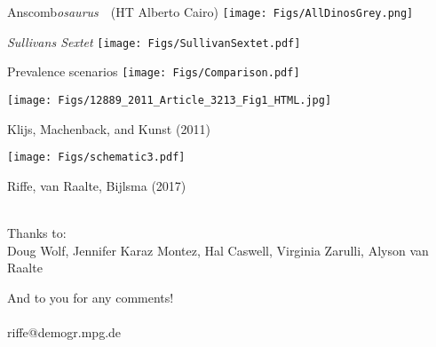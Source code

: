 \documentclass[20pt,usenames,dvipsnames]{beamer}
\begin{document}
\begin{frame}[plain]
\Huge
\begin{center}
Anscomb\emph{osaurus}~~\small (HT Alberto Cairo)
\texttt{[image: Figs/AllDinosGrey.png]}
\end{center}
\end{frame}


\begin{frame}[plain]
\Huge
\begin{center}
\emph{Sullivans Sextet} 
\texttt{[image: Figs/SullivanSextet.pdf]}
\end{center}
\end{frame}


\begin{frame}[plain]
\Huge
Prevalence scenarios
\texttt{[image: Figs/Comparison.pdf]}
\end{frame}

\begin{frame}[plain]
\small
\begin{center}
\texttt{[image: Figs/12889\_2011\_Article\_3213\_Fig1\_HTML.jpg]}
\end{center}

Klijs, Machenback, and Kunst (2011)
\end{frame}

\begin{frame}[plain]
\small
\begin{center}
\texttt{[image: Figs/schematic3.pdf]}
\end{center}
Riffe, van Raalte, Bijlsma (2017)\\~
\end{frame}

\begin{frame}[plain]
\huge
\begin{center}
Thanks to:\\
Doug Wolf, Jennifer Karaz Montez, Hal Caswell, Virginia Zarulli,
Alyson van Raalte


\vspace{2em}
\pause
And to you for any comments!\\ \\

\Large
riffe@demogr.mpg.de
\end{center}
\end{frame}
\end{document}
